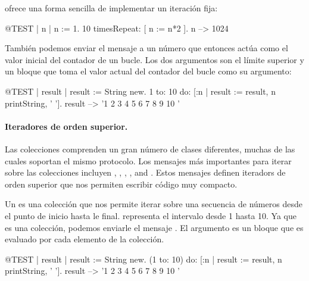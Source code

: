 \documentclass[a4paper,10pt,twoside]{book}
\begin{document}
\noindent
{} ofrece una forma sencilla de implementar un iteración fija:

\begin{code}{@TEST | n |}
n := 1.
10 timesRepeat: [ n := n*2 ].
n --> 1024
\end{code}

También podemos enviar el mensaje  a un número que entonces actúa como el valor inicial del contador de un bucle.
Los dos argumentos son el límite superior y un bloque que toma el valor actual del contador del bucle como su argumento: 

\begin{code}{@TEST | result |}
result := String new.
1 to: 10 do: [:n | result := result, n printString, ' '].
result --> '1 2 3 4 5 6 7 8 9 10 '
\end{code}


\paragraph{Iteradores de orden superior.}
Las colecciones comprenden un gran número de clases diferentes, muchas de las cuales soportan el mismo protocolo.
Los mensajes más importantes para iterar sobre las colecciones incluyen 
, , , ,  and .
Estos mensajes definen iteradors de orden superior que nos permiten escribir código muy compacto.

Un  es una colección que nos permite iterar sobre una secuencia de números desde el punto de inicio hasta le final.  representa el intervalo desde 1 hasta 10.
Ya que es una colección, podemos enviarle el mensaje .
El argumento es un bloque que es evaluado por cada elemento de la colección.

\begin{code}{@TEST | result |}
result := String new.
(1 to: 10) do: [:n | result := result, n printString, ' '].
result --> '1 2 3 4 5 6 7 8 9 10 '
\end{code}
\end{document}
